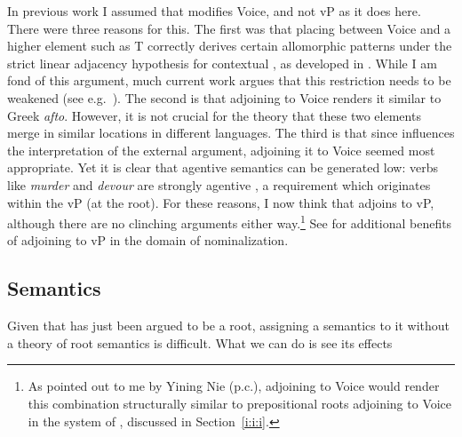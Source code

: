 \begin{exe}
\begin{xlist}
\begin{exe}
\begin{xlist}
\begin{exe}
\begin{xlist}
\begin{exe}
\begin{exe}
\begin{xlist}
\begin{exe}
\begin{xlist}
\begin{exe}
\begin{xlist}
\begin{exe}
\begin{xlist}
\begin{exe}
\begin{xlist}
\begin{exe}
\begin{xlist}
\begin{exe}
\begin{xlist}
\begin{exe}
\begin{xlist}
\begin{xlist}
\begin{exe}
\begin{xlist}
\begin{exe}
\begin{xlist}
\begin{exe}
\begin{xlist}
\begin{exe}
\begin{xlist}
\begin{exe}
\begin{xlist}
\begin{exe}
\begin{xlist}
\begin{exe}
\begin{xlist}
\begin{exe}
\begin{xlist}
\begin{exe}
\begin{xlist}
\begin{exe}
\begin{xlist}
\begin{exe}
\begin{xlist}
\begin{exe}
\begin{xlist}
\begin{xlist}
\begin{xlist}
\begin{exe}
\begin{xlist}
\begin{xlist}
\begin{xlist}
\begin{exe}
\begin{exe}
\begin{xlist}
\begin{exe}
\begin{xlist}
\begin{exe}
\begin{xlist}
\begin{exe}
\begin{xlist}
\begin{exe}
\begin{xlist}
\begin{exe}
\begin{xlist}
\begin{exe}
\begin{xlist}
\begin{exe}
\begin{exe}
\begin{xlist}
\begin{xlist}
\begin{exe}
\begin{xlist}
\begin{exe}
\begin{xlist}
\begin{exe}
\begin{xlist}
\begin{exe}
\begin{xlist}
\begin{exe}
\begin{xlist}
\begin{exe}
\begin{xlist}
\begin{exe}
\begin{exe}
\begin{exe}
\begin{xlist}
\begin{exe}
\begin{xlist}
In previous work \citep{kastner16phd,kastner17gjgl,kastner18nllt} I assumed that {\va} modifies Voice, and not vP as it does here. There were three reasons for this. The first was that placing {\va} between Voice and a higher element such as T correctly derives certain allomorphic patterns under the strict linear adjacency hypothesis for contextual  \citep{embick10,marantz13}, as developed in \cite{kastner18nllt}. While I am fond of this argument, much current work argues that this restriction needs to be weakened (see e.g.~\citealt{kastnermoskal18,choiharley19}). The second is that adjoining {\va} to Voice renders it similar to Greek \emph{afto}. However, it is not crucial for the theory that these two elements merge in similar locations in different languages. The third is that since {\va} influences the interpretation of the external argument, adjoining it to Voice seemed most appropriate. Yet it is clear that agentive semantics can be generated low: verbs like \emph{murder} and \emph{devour} are strongly agentive \citep{haspelmath93,unaccusativity95,marantz97,layering15}, a requirement which originates within the vP (at the root). For these reasons, I now think that {\va} adjoins to vP, although there are no clinching arguments either way.\footnote{As pointed out to me by Yining Nie (p.c.), adjoining {\va} to Voice would render this combination structurally similar to prepositional roots adjoining to Voice in the \textit{} system of \cite{woodmarantz17}, discussed in Section~\ref{i:i:i}.} See \cite{ahdout19phd} for additional benefits of adjoining {\va} to vP in the domain of nominalization.

	\subsection{Semantics} \label{voice:va:sem}
Given that {\va} has just been argued to be a root, assigning a semantics to it without a theory of root semantics is difficult. What we can do is see its effects 
\end{xlist}
\end{exe}
\end{xlist}
\end{exe}
\end{exe}
\end{exe}
\end{xlist}
\end{exe}
\end{xlist}
\end{exe}
\end{xlist}
\end{exe}
\end{xlist}
\end{exe}
\end{xlist}
\end{exe}
\end{xlist}
\end{exe}
\end{xlist}
\end{xlist}
\end{exe}
\end{exe}
\end{xlist}
\end{exe}
\end{xlist}
\end{exe}
\end{xlist}
\end{exe}
\end{xlist}
\end{exe}
\end{xlist}
\end{exe}
\end{xlist}
\end{exe}
\end{xlist}
\end{exe}
\end{exe}
\end{xlist}
\end{xlist}
\end{xlist}
\end{exe}
\end{xlist}
\end{xlist}
\end{xlist}
\end{exe}
\end{xlist}
\end{exe}
\end{xlist}
\end{exe}
\end{xlist}
\end{exe}
\end{xlist}
\end{exe}
\end{xlist}
\end{exe}
\end{xlist}
\end{exe}
\end{xlist}
\end{exe}
\end{xlist}
\end{exe}
\end{xlist}
\end{exe}
\end{xlist}
\end{exe}
\end{xlist}
\end{exe}
\end{xlist}
\end{xlist}
\end{exe}
\end{xlist}
\end{exe}
\end{xlist}
\end{exe}
\end{xlist}
\end{exe}
\end{xlist}
\end{exe}
\end{xlist}
\end{exe}
\end{xlist}
\end{exe}
\end{xlist}
\end{exe}
\end{exe}
\end{xlist}
\end{exe}
\end{xlist}
\end{exe}
\end{xlist}
\end{exe}
